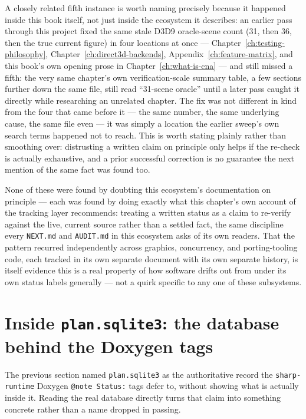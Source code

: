 A closely related fifth instance is worth naming precisely because it happened inside this book
itself, not just inside the ecosystem it describes: an earlier pass through this project fixed
the same stale D3D9 oracle-scene count (31, then 36, then the true current figure) in four
locations at once --- Chapter~\ref{ch:testing-philosophy}, Chapter~\ref{ch:direct3d-backends},
Appendix~\ref{ch:feature-matrix}, and this book's own opening prose in
Chapter~\ref{ch:what-is-cna} --- and still missed a fifth: the very same chapter's own
verification-scale summary table, a few sections further down the same file, still read
``31-scene oracle'' until a later pass caught it directly while researching an unrelated
chapter. The fix was not different in kind from the four that came before it --- the same
number, the same underlying cause, the same file even --- it was simply a location the earlier
sweep's own search terms happened not to reach. This is worth stating plainly rather than
smoothing over: distrusting a written claim on principle only helps if the re-check is
actually exhaustive, and a prior successful correction is no guarantee the next mention of the
same fact was found too.

None of these were found by doubting this ecosystem's documentation on principle --- each was
found by doing exactly what this chapter's own account of the tracking layer recommends:
treating a written status as a claim to re-verify against the live, current source rather than
a settled fact, the same discipline every \texttt{NEXT.md} and \texttt{AUDIT.md} in this
ecosystem asks of its own readers. That the pattern recurred independently across graphics,
concurrency, and porting-tooling code, each tracked in its own separate document with its own
separate history, is itself evidence this is a real property of how software drifts out from
under its own status labels generally --- not a quirk specific to any one of these subsystems.

\section{Inside \texttt{plan.sqlite3}: the database behind the Doxygen tags}

The previous section named \texttt{plan.sqlite3} as the authoritative record the
\texttt{sharp-runtime} Doxygen \texttt{@note Status:} tags defer to, without showing what is
actually inside it. Reading the real database directly turns that claim into something
concrete rather than a name dropped in passing.

